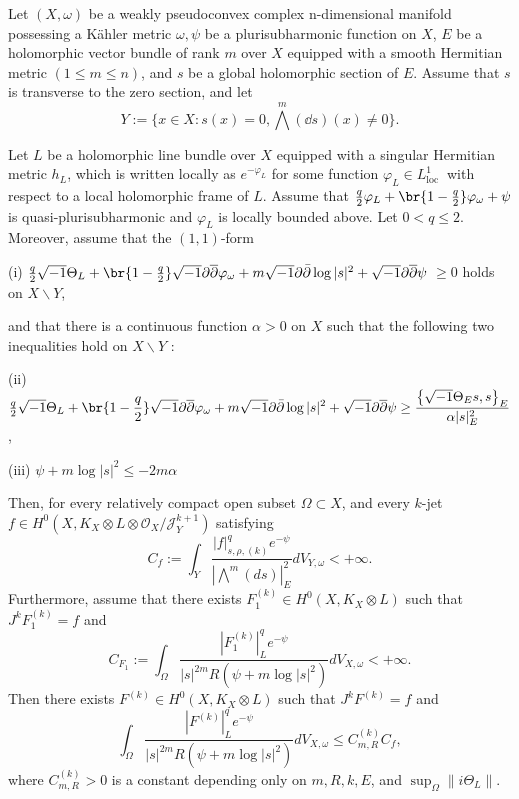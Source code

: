 \documentclass[lang=en,12pt,twoside]{textbook}
\begin{document}
\begin{theorem}\label{thm:main}
  Let $(X, \omega)$ be a weakly pseudoconvex complex n-dimensional manifold possessing a Kähler metric $\omega, \psi$ be a plurisubharmonic function on $X$, $E$ be a holomorphic vector bundle of rank $m$ over $X$ equipped with a smooth Hermitian metric $(1 \leq m\leq n)$, and $s$ be a global holomorphic section of $E$. Assume that $s$ is transverse to the zero section, and let
$$
Y:=\{x \in X: s(x)=0, \bigwedge^m (\dd s)(x)\neq 0\} .
$$

Let $L$ be a holomorphic line bundle over $X$ equipped with a singular Hermitian metric $h_L$, which is written locally as $e^{-\varphi_L}$ for some function $\varphi_L \in L_{\text {loc }}^1$ with respect to a local holomorphic frame of $L$. {\color{purple} Assume that $\frac{q}{2}\varphi_L+\br{1-\frac{q}{2}}\varphi_\omega+\psi$ is quasi-plurisubharmonic} and $\varphi_L$ is locally bounded above.  Let $0<q\leq 2$.  Moreover, assume that the $(1,1)$-form  \vspace{.25em}

{\color{purple} {\upshape (i)} \vspace{.25em}$\frac{q}{2}\sqrt{-1} \Theta_L+\br{1-\frac{q}{2}}\sqrt{-1}\bd\bdd\varphi_\omega+ m\sqrt{-1} \partial \bar{\partial} \log |s|^2+\xu\bd\bdd \psi $ $\geq 0$ 
holds on $X \backslash Y$,} 

and that there is a continuous function $\alpha>0$ on $X$ such that the following two inequalities hold on $X \backslash Y$ :

{\upshape (ii)} $\frac{q}{2}\displaystyle\sqrt{-1} \Theta_L+\br{1-\frac{q}{2}}\sqrt{-1}\bd\bdd\varphi_\omega+m\sqrt{-1} \partial \bar{\partial} \log |s|^2+\xu\bd\bdd \psi \geq \frac{\left\{\sqrt{-1} \Theta_E s, s\right\}_E}{\alpha|s|_E^2}$,

{\upshape (iii)} $\psi+m\log |s|^2\leq-2 m\alpha$ 

\noindent Then, for every relatively compact open subset $\Omega \subset X$, and every $k$-jet $f \in H^0\left(X, K_X\otimes L \otimes \mathcal{O}_X / \mathcal{J}_Y^{k+1}\right)$ satisfying
$$
C_f :=\int_Y \frac{|f|_{s, \rho,(k)}^q e^{-\psi}}{\left|\bigwedge^m(d s)\right|^{2}_E }d V_{Y, \omega}<+\infty.
$$
Furthermore, assume that there exists $F_1^{(k)} \in H^0\left(X, K_X \otimes L\right)$ such that $J^k F_1^{(k)} =f$ and
$$
C_{F_1}:=\int_{\Omega} \frac{\left|F_1^{(k)}\right|_L^q e^{-\psi}}{|s|^{2m} R(\psi+m\log |s|^2)} d V_{X, \omega} < +\infty.
$$
Then there exists $F^{(k)} \in H^0\left(X, K_X \otimes L\right)$ such that $J^k F^{(k)}=f$ and
$$
\int_{\Omega} \frac{\left|F^{(k)}\right|_L^q e^{-\psi}}{|s|^{2m} R(\psi+m\log |s|^2)} d V_{X, \omega} \leq C_{m,R}^{(k)} C_f,
$$
where $C_{m,R}^{(k)}>0$ is a constant depending only on $m,R,k, E$, and $\sup _{\Omega}\|i \Theta_L\|$.

\end{theorem}
\end{document}

